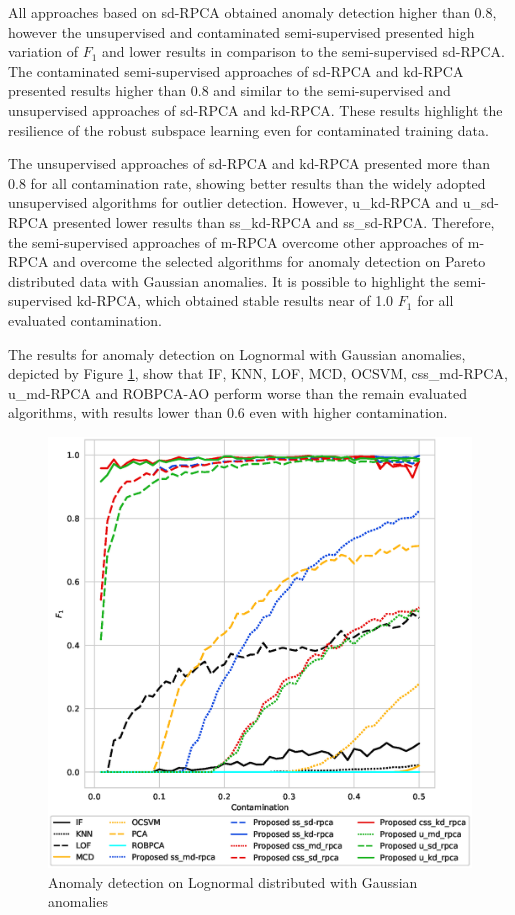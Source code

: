 All approaches based on sd-RPCA obtained anomaly detection higher than 0.8, however the unsupervised and contaminated semi-supervised presented high variation of $F_1$ and lower results in comparison to the semi-supervised sd-RPCA. The contaminated semi-supervised approaches of sd-RPCA and kd-RPCA presented results higher than 0.8 and similar to the semi-supervised and unsupervised approaches of sd-RPCA and kd-RPCA. These results highlight the resilience of the robust subspace learning even for contaminated training data.

The unsupervised approaches of sd-RPCA and kd-RPCA presented more than 0.8 for all contamination rate, showing better results than the widely adopted unsupervised algorithms for outlier detection. However, u\_kd-RPCA and u\_sd-RPCA presented lower results than ss\_kd-RPCA and ss\_sd-RPCA. Therefore, the semi-supervised approaches of m-RPCA overcome other approaches of m-RPCA and overcome the selected algorithms for anomaly detection on Pareto distributed data with Gaussian anomalies. It is possible to highlight the semi-supervised kd-RPCA, which obtained stable results near of 1.0 $F_1$ for all evaluated contamination.

The results for anomaly detection on Lognormal with Gaussian anomalies, depicted by Figure \ref{fig:4.12}, show that IF, KNN, LOF, MCD, OCSVM, css\_md-RPCA, u\_md-RPCA and ROBPCA-AO perform worse than the remain evaluated algorithms, with results lower than 0.6 even with higher contamination. 

\begin{figure}[h!]
	\centering
	\includegraphics[width=12cm]{figures/ch4/lognormal_f1_contamination.eps}
	\caption{Anomaly detection on Lognormal distributed with Gaussian anomalies}
	\label{fig:4.12}
\end{figure}

